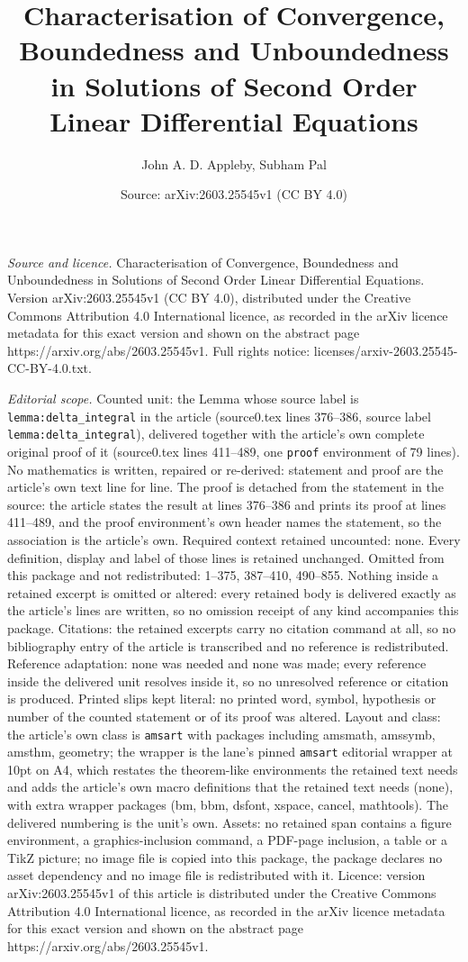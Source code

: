 \documentclass[10pt,a4paper]{amsart}
\title[Characterisation of Convergence, Boundedness and Unboundedne]{Characterisation of Convergence, Boundedness and Unboundedness in Solutions of Second Order Linear Differential Equations}
\author{John A. D. Appleby, Subham Pal}
\date{Source: arXiv:2603.25545v1 (CC BY 4.0)}
\begin{document}
\maketitle

\noindent\emph{Source and licence.} Characterisation of Convergence, Boundedness and Unboundedness in Solutions of Second Order Linear Differential Equations. Version arXiv:2603.25545v1 (CC BY 4.0), distributed under the Creative Commons Attribution 4.0 International licence, as recorded in the arXiv licence metadata for this exact version and shown on the abstract page https://arxiv.org/abs/2603.25545v1. Full rights notice: licenses/arxiv-2603.25545-CC-BY-4.0.txt.\par\smallskip

\noindent\textit{Editorial scope.} Counted unit: the Lemma whose source label is \texttt{lemma:delta\_integral} in the article (source0.tex lines 376--386, source label \texttt{lemma:delta\_integral}), delivered together with the article's own complete original proof of it (source0.tex lines 411--489, one \texttt{proof} environment of 79 lines). No mathematics is written, repaired or re-derived: statement and proof are the article's own text line for line. The proof is detached from the statement in the source: the article states the result at lines 376--386 and prints its proof at lines 411--489, and the proof environment's own header names the statement, so the association is the article's own. Required context retained uncounted: none. Every definition, display and label of those lines is retained unchanged. Omitted from this package and not redistributed: 1--375, 387--410, 490--855. Nothing inside a retained excerpt is omitted or altered: every retained body is delivered exactly as the article's lines are written, so no omission receipt of any kind accompanies this package. Citations: the retained excerpts carry no citation command at all, so no bibliography entry of the article is transcribed and no reference is redistributed. Reference adaptation: none was needed and none was made; every reference inside the delivered unit resolves inside it, so no unresolved reference or citation is produced. Printed slips kept literal: no printed word, symbol, hypothesis or number of the counted statement or of its proof was altered. Layout and class: the article's own class is \texttt{amsart} with packages including amsmath, amssymb, amsthm, geometry; the wrapper is the lane's pinned \texttt{amsart} editorial wrapper at 10pt on A4, which restates the theorem-like environments the retained text needs and adds the article's own macro definitions that the retained text needs (none), with extra wrapper packages (bm, bbm, dsfont, xspace, cancel, mathtools). The delivered numbering is the unit's own. Assets: no retained span contains a figure environment, a graphics-inclusion command, a PDF-page inclusion, a table or a TikZ picture; no image file is copied into this package, the package declares no asset dependency and no image file is redistributed with it. Licence: version arXiv:2603.25545v1 of this article is distributed under the Creative Commons Attribution 4.0 International licence, as recorded in the arXiv licence metadata for this exact version and shown on the abstract page https://arxiv.org/abs/2603.25545v1. 
\end{document}
